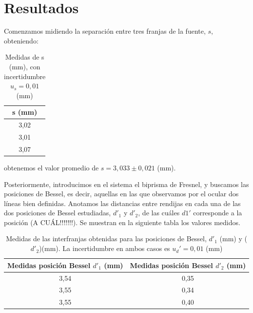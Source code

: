 \documentclass[10pt,onecolumn]{article}
\begin{document}

\tableofcontents %
\newpage

\HRule{0.5pt} %

\begin{abstract}

\end{abstract}

\section{Resultados}
Comenzamos midiendo la separación entre tres franjas de la fuente, $s$, obteniendo:
\begin{table}[H]
\centering
\begin{tabular}{|c|}
\hline
\rowcolor[rgb]{ .651,  .788,  .925}
\textbf{s (mm)} \\ \hline
\rowcolor[rgb]{.816,  .816,  .816} 3,02 \\ \hline
\rowcolor[rgb]{.816,  .816,  .816} 3,01 \\ \hline
\rowcolor[rgb]{.816,  .816,  .816} 3,07 \\ \hline
\end{tabular}
\caption{Medidas de s (mm), con incertidumbre $u_s=0,01$ (mm)}
\label{tab:medidas_S}
\end{table}

obtenemos el valor promedio de $s=3,033\pm 0,021$ (mm).

Posteriormente, introducimos en el sistema el biprisma de Fresnel, y buscamos las posiciones de Bessel, es decir, aquellas en las que observamos por el ocular dos líneas bien definidas.
Anotamos las distancias entre rendijas en cada una de las dos posiciones de Bessel estudiadas, $d'_1$ y $d'_2$, de las cuáles $d1'$ corresponde a la posición (A CUÁL!!!!!!!). Se muestran en la siguiente tabla los valores medidos.
\begin{table}[H]
\centering
\begin{tabular}{|c|c|}
\hline
\rowcolor[rgb]{ .651,  .788,  .925}
\textbf{Medidas posición Bessel $d'_1$ (mm)} & \textbf{Medidas posición Bessel $d'_2$ (mm)} \\ \hline
\rowcolor[rgb]{.816,  .816,  .816} 3,54 & 0,35 \\ \hline
\rowcolor[rgb]{.816,  .816,  .816} 3,55 & 0,34 \\ \hline
\rowcolor[rgb]{.816,  .816,  .816} 3,55 & 0,40 \\ \hline
\end{tabular}
\caption{Medidas de las interfranjas obtenidas para las posiciones de Bessel, $d'_1$ (mm) y ($d'_2$)(mm). La incertidumbre en ambos casos es $u_d'=0,01$ (mm)}
\label{tab:franjas_cerca_lejos}
\end{table}
\end{document}
